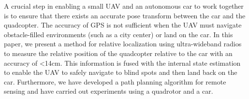 A crucial step in enabling a small UAV and an autonomous car to work
together is to ensure that there exists an accurate pose transform between the car
and the quadcopter. The accuracy of GPS is not sufficient when the UAV must navigate
obstacle-filled environments (such as a city center) or land on the car. In this 
paper, we present a method for relative localization using ultra-wideband radios to measure the relative position of the quadcopter relative to the car with an accuracy of <14cm. This information is fused with the internal state estimation to enable the UAV to safely navigate to blind spots and then land back on the car. Furthermore, we have developed a path planning algorithm for remote sensing and have carried out experiments using a quadrotor and a car.



%
%
%



